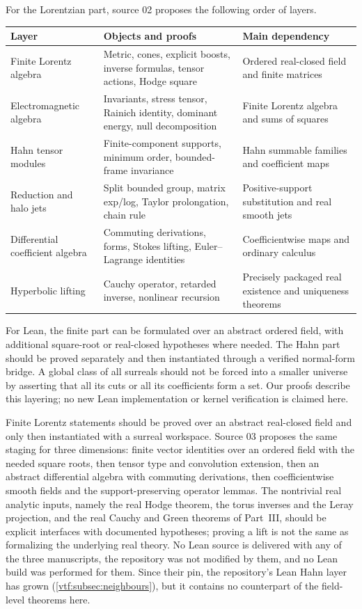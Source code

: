 \documentclass[11pt,letterpaper]{article}
\theoremstyle{definition}
\theoremstyle{remark}
\begin{document}
For the Lorentzian part, source 02 proposes the following order of layers.

\begin{center}\small
\begin{tabularx}{\textwidth}{@{}P{0.2\textwidth}>{\raggedright\arraybackslash}XP{0.25\textwidth}@{}}
\toprule
Layer & Objects and proofs & Main dependency\\
\midrule
Finite Lorentz algebra & Metric, cones, explicit boosts, inverse formulas, tensor actions, Hodge square & Ordered real-closed field and finite matrices\\
Electromagnetic algebra & Invariants, stress tensor, Rainich identity, dominant energy, null decomposition & Finite Lorentz algebra and sums of squares\\
Hahn tensor modules & Finite-component supports, minimum order, bounded-frame invariance & Hahn summable families and coefficient maps\\
Reduction and halo jets & Split bounded group, matrix exp/log, Taylor prolongation, chain rule & Positive-support substitution and real smooth jets\\
Differential coefficient algebra & Commuting derivations, forms, Stokes lifting, Euler--Lagrange identities & Coefficientwise maps and ordinary calculus\\
Hyperbolic lifting & Cauchy operator, retarded inverse, nonlinear recursion & Precisely packaged real existence and uniqueness theorems\\
\bottomrule
\end{tabularx}
\end{center}

For Lean, the finite part can be formulated over an abstract ordered field,
with additional square-root or real-closed hypotheses where needed. The Hahn
part should be proved separately and then instantiated through a verified
normal-form bridge. A global class of all surreals should not be forced into
a smaller universe by asserting that all its cuts or all its coefficients
form a set. Our proofs describe this layering; no new Lean implementation or
kernel verification is claimed here.

Finite Lorentz statements should be proved over an abstract real-closed field and
only then instantiated with a surreal workspace. Source 03 proposes the same
staging for three dimensions: finite vector identities over an ordered field with
the needed square roots, then tensor type and convolution extension, then an
abstract differential algebra with commuting derivations, then coefficientwise
smooth fields and the support-preserving operator lemmas. The nontrivial real
analytic inputs, namely the real Hodge theorem, the torus inverses and the Leray
projection, and the real Cauchy and Green theorems of Part~III, should be
explicit interfaces with documented hypotheses; proving a lift is not the same
as formalizing the underlying real theory. No Lean source is delivered with any
of the three manuscripts, the repository was not modified by them, and no Lean
build was performed for them. Since their pin, the repository's Lean Hahn layer
has grown (\cref{vtf:subsec:neighbours}), but it contains no counterpart of the
field-level theorems here.
\end{document}
